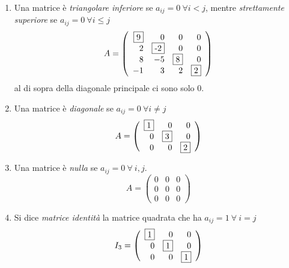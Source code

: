 \documentclass[a4paper]{article}
\begin{document}
\begin{enumerate}
	\item Una matrice è \textit{triangolare inferiore} se $a_{ij}=0 \ \forall i<j$, mentre \textit{strettamente superiore} se $ a_{ij}=0 \ \forall i \le j $
	\begin{equation*}
		A=
		\left(  
		\begin{array}{rrrr}
			\fbox{9} & 0 & 0 & 0 \\
			2 & \fbox{-2} & 0 & 0 \\
			8 & -5 & \fbox{8} & 0 \\
			-1 & 3 & 2 & \fbox{2}
		\end{array}\right) 
	\end{equation*}
	al di sopra della diagonale principale ci sono solo $0$.
	\item Una matrice è \textit{diagonale} se $ a_{ij} = 0 \ \forall i\neq j $
	\begin{equation*}
		A=
		\left(  
		\begin{array}{rrrr}
			\fbox{1} & 0 & 0\\
			0 & \fbox{3} & 0 \\
			0 & 0 & \fbox{2}
		\end{array}\right) 
	\end{equation*}
	\item Una matrice è \textit{nulla} se $ a_{ij}=0 \ \forall \ i,j $.
	\begin{equation*}
		A=
		\left(  
		\begin{array}{rrrr}
			0 & 0 & 0\\
			0 & 0 & 0 \\
			0 & 0 & 0
		\end{array}\right) 
	\end{equation*}
	\item Si dice \textit{matrice identità} la matrice quadrata che ha $ a_{ij}=1 \ \forall \ i=j$
	\begin{equation*}
		I_3=
		\left(  
		\begin{array}{rrrr}
			\fbox{1} & 0 & 0\\
			0 & \fbox{1} & 0 \\
			0 & 0 & \fbox{1}
		\end{array}\right) 
	\end{equation*}
\end{enumerate}
\end{document}
